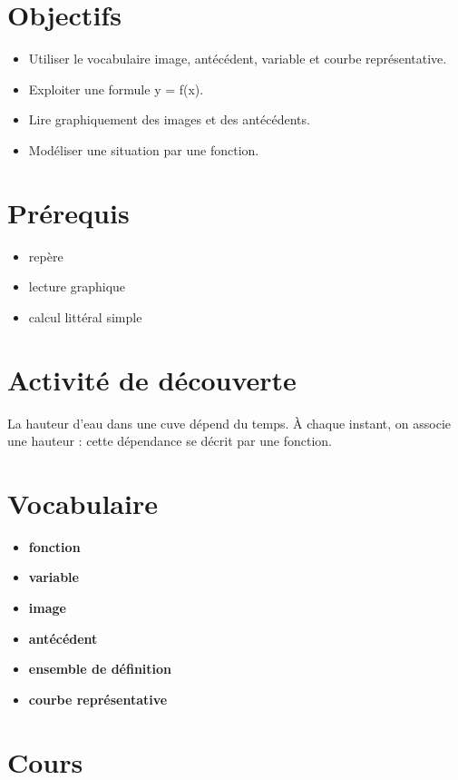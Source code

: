 \section{Objectifs}

\begin{itemize}
\item Utiliser le vocabulaire image, antécédent, variable et courbe représentative.
\item Exploiter une formule y = f(x).
\item Lire graphiquement des images et des antécédents.
\item Modéliser une situation par une fonction.
\end{itemize}

\section{Prérequis}

\begin{itemize}
\item repère
\item lecture graphique
\item calcul littéral simple
\end{itemize}

\section{Activité de découverte}

La hauteur d'eau dans une cuve dépend du temps. À chaque instant, on associe une hauteur : cette dépendance se décrit par une fonction.

\section{Vocabulaire}

\begin{itemize}
\item \textbf{fonction}
\item \textbf{variable}
\item \textbf{image}
\item \textbf{antécédent}
\item \textbf{ensemble de définition}
\item \textbf{courbe représentative}
\end{itemize}

\section{Cours}

